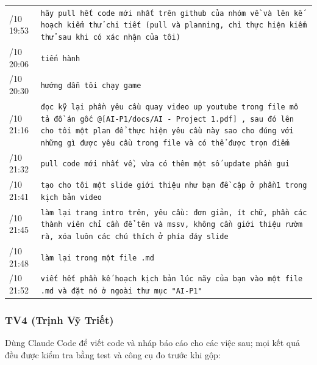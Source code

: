 {\begin{longtable}[]{@{}
  >{\raggedright\arraybackslash}p{}
  >{\raggedright\arraybackslash}p{}@{}}
\rowrule
31/10 19:53 & \texttt{hãy pull hết code mới nhất trên github của nhóm về và lên kế hoạch kiểm thử chi tiết (pull và planning, chỉ thực hiện kiểm thử sau khi có xác nhận của tôi)} \\
\rowrule
31/10 20:06 & \texttt{tiến hành} \\
\rowrule
31/10 20:30 & \texttt{hướng dẫn tôi chạy game} \\
\rowrule
31/10 21:16 & \texttt{đọc kỹ lại phần yêu cầu quay video up youtube trong file mô tả đồ án gốc @[AI-\allowbreak{}P1/\allowbreak{}docs/\allowbreak{}AI -\allowbreak{} Project 1.\allowbreak{}pdf] , sau đó lên cho tôi một plan để thực hiện yêu cầu này sao cho đúng với những gì được yêu cầu trong file và có thể được trọn điểm} \\
\rowrule
31/10 21:32 & \texttt{pull code mới nhất về, vừa có thêm một số update phần gui} \\
\rowrule
31/10 21:41 & \texttt{tạo cho tôi một slide giới thiệu như bạn đề cập ở phần1 trong kịch bản video} \\
\rowrule
31/10 21:45 & \texttt{làm lại trang intro trên, yêu cầu: đơn giản, ít chữ, phần các thành viên chỉ cần để tên và mssv, không cần giới thiệu rườm rà, xóa luôn các chú thích ở phía đáy slide} \\*
\rowrulenb
31/10 21:48 & \texttt{làm lại trong một file .\allowbreak{}md} \\*
\rowrulenb
31/10 21:52 & \texttt{viết hết phần kế hoạch kịch bản lúc nãy của bạn vào một file .\allowbreak{}md và đặt nó ở ngoài thư mục "AI-\allowbreak{}P1"} \\
\end{longtable}
}

\subsubsection{TV4 (Trịnh Vỹ Triết)}

Dùng Claude Code để viết code và nháp báo cáo cho các việc sau; mọi kết quả đều được kiểm tra bằng test và công cụ đo trước khi gộp:



